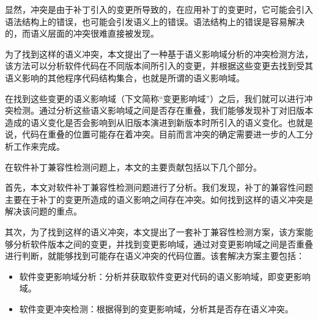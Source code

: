 
%

显然，冲突是由于补丁引入的变更所导致的，在应用补丁的变更时，它可能会引入语法结构上的错误，也可能会引发语义上的错误。语法结构上的错误是容易解决的，而语义层面的冲突很难直接被发现。

为了找到这样的语义冲突，本文提出了一种基于语义影响域分析的冲突检测方法，该方法可以分析软件代码在不同版本间所引入的变更，并根据这些变更去找到受其语义影响的其他程序代码结构集合，也就是所谓的语义影响域。

在找到这些变更的语义影响域（下文简称“变更影响域”）之后，我们就可以进行冲突检测。通过分析这些语义影响域之间是否存在重叠，我们能够发现补丁对旧版本造成的语义变化是否会影响到从旧版本演进到新版本时所引入的语义变化。也就是说，代码在重叠的位置可能存在着冲突。目前而言冲突的确定需要进一步的人工分析工作来完成。

在软件补丁兼容性检测问题上，本文的主要贡献包括以下几个部分。

首先，本文对软件补丁兼容性检测问题进行了分析。我们发现，补丁的兼容性问题主要在于补丁的变更所造成的语义影响之间存在冲突。如何找到这样的语义冲突是解决该问题的重点。

其次，为了找到这样的语义冲突，本文提出了一套补丁兼容性检测方案，该方案能够分析软件版本之间的变更，并找到变更影响域，通过对变更影响域之间是否重叠进行判断，就能够找到可能存在语义冲突的代码位置。该套解决方案主要包括：
	\begin{itemize}
		\item 软件变更影响域分析：分析并获取软件变更对代码的语义影响域，即变更影响域。
		\item 软件变更冲突检测：根据得到的变更影响域，分析其是否存在语义冲突。
	\end{itemize}
	

